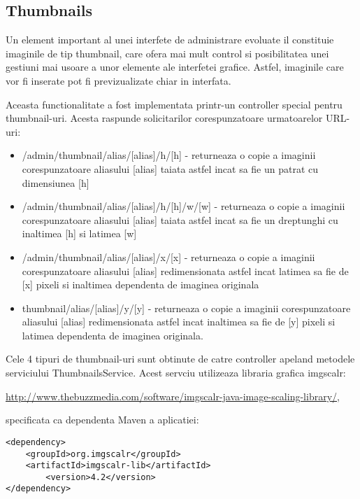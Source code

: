 \subsection{Thumbnails}

Un element important al unei interfete de administrare evoluate il constituie imaginile de tip thumbnail, care ofera mai mult control si posibilitatea unei gestiuni mai usoare a unor elemente ale interfetei grafice. Astfel, imaginile care vor fi inserate pot fi previzualizate chiar in interfata.

Aceasta functionalitate a fost implementata printr-un controller special pentru thumbnail-uri. Acesta raspunde solicitarilor corespunzatoare urmatoarelor URL-uri:

\begin{itemize}
\item{/admin/thumbnail/alias/[alias]/h/[h] - returneaza o copie a imaginii corespunzatoare aliasului [alias] taiata astfel incat sa fie un patrat cu dimensiunea [h]}

\item{/admin/thumbnail/alias/[alias]/h/[h]/w/[w] - returneaza o copie a imaginii corespunzatoare aliasului [alias] taiata astfel incat sa fie un dreptunghi cu inaltimea [h] si latimea [w]}

\item{/admin/thumbnail/alias/[alias]/x/[x] - returneaza o copie a imaginii corespunzatoare aliasului [alias] redimensionata astfel incat latimea sa fie de [x] pixeli si inaltimea dependenta de imaginea originala}

\item{thumbnail/alias/[alias]/y/[y] - returneaza o copie a imaginii corespunzatoare aliasului [alias] redimensionata astfel incat inaltimea sa fie de [y] pixeli si latimea dependenta de imaginea originala.}

\end{itemize}

Cele 4 tipuri de thumbnail-uri sunt obtinute de catre controller apeland metodele serviciului ThumbnailsService. Acest servciu utilizeaza libraria grafica imgscalr:

\url{http://www.thebuzzmedia.com/software/imgscalr-java-image-scaling-library/}, 

specificata ca dependenta Maven a aplicatiei:

\begin{lstlisting}[breaklines=true]
<dependency>
	<groupId>org.imgscalr</groupId>
	<artifactId>imgscalr-lib</artifactId>
    	<version>4.2</version> 
</dependency> 
\end{lstlisting}	

